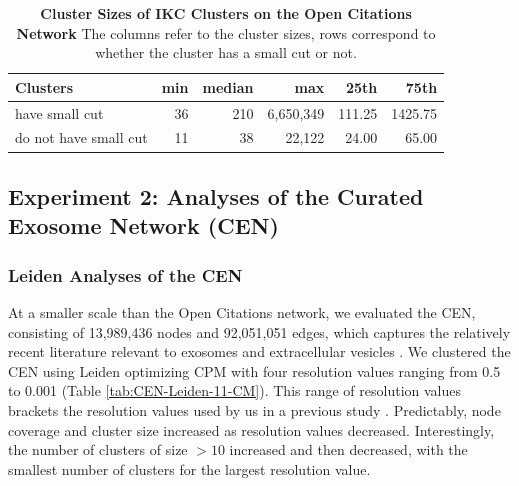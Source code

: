 \documentclass[11pt]{article}   	%
\begin{document}
\begin{table}[ht]
\centering
\begin{tabular}{lrrrrr}
    \hline
Clusters              & min & median & max    & 25th    & 75th    \\
    \hline
have small cut    & 36  & 210    & 6,650,349 & 111.25 & 1425.75 \\
do not have small cut & 11  & 38     & 22,122  & 24.00     & 65.00         \\
    \hline
\end{tabular}
\caption[Cluster Sizes of IKC Clusters on the Open Citations Network]{\textbf{ Cluster Sizes of IKC Clusters on the Open Citations Network}  The columns refer to the  cluster sizes, rows correspond to whether the cluster has a small cut or not.}
\label{tab:IKC-OC-sizes}
\end{table}

\clearpage
\subsection{Experiment 2: Analyses of the Curated Exosome Network (CEN)}

\subsubsection{Leiden Analyses of the CEN}

At a smaller scale than the Open Citations network, we evaluated the CEN, consisting of 13,989,436 nodes and 92,051,051 edges, which captures the relatively recent literature relevant to exosomes and extracellular vesicles \cite{van2022challenges}. We clustered the CEN using Leiden optimizing CPM with  four resolution values ranging from 0.5 to 0.001 (Table \ref{tab:CEN-Leiden-11-CM}).
This range of resolution values brackets the resolution values used by us in a previous study \cite{Jakatdar_2022}. Predictably, node coverage and cluster size increased as resolution values  decreased. Interestingly, the number of clusters of size $>10$ increased and then decreased, with the smallest number of clusters for the largest resolution value.
\end{document}
